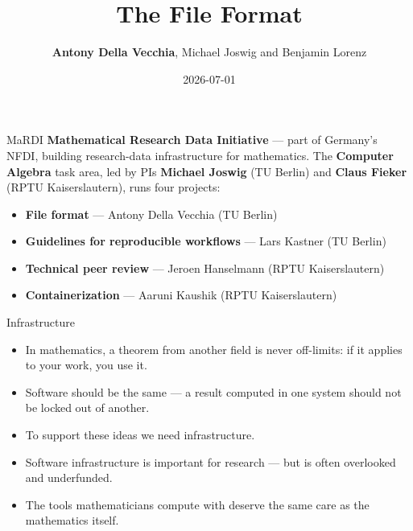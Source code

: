 \documentclass[9pt]{beamer}
\author[Antony Della Vecchia]{\textbf{Antony Della Vecchia}, Michael Joswig and Benjamin Lorenz}
\title{The \mrdi File Format}
\institute[]{
  TU Berlin
}
\date{
  2026-07-01
}
\newenvironment{fillitemize}
  {\vspace{\fill}\begin{itemize}\setlength{\itemsep}{\fill}}
  {\end{itemize}\vspace{\fill}}
\begin{document}
\maketitle

\begin{frame}[fragile]{MaRDI}
  \textbf{Mathematical Research Data Initiative} --- part of Germany's NFDI,
  building research-data infrastructure for mathematics. \pause
  \vfill
  The \textbf{Computer Algebra} task area, led by PIs
  \textbf{Michael Joswig} (TU Berlin) and \textbf{Claus Fieker}
  (RPTU Kaiserslautern), runs four projects: \pause
  \begin{itemize}
  \item \textbf{File format} --- Antony Della Vecchia (TU Berlin) 
  \item \textbf{Guidelines for reproducible workflows} --- Lars Kastner (TU Berlin) 
  \item \textbf{Technical peer review} --- Jeroen Hanselmann (RPTU Kaiserslautern) 
  \item \textbf{Containerization} --- Aaruni Kaushik (RPTU Kaiserslautern)
  \end{itemize}
\end{frame}


\begin{frame}[fragile, t]{Infrastructure}
  \begin{fillitemize}
  \item In mathematics, a theorem from another field is never off-limits:
    if it applies to your work, you use it. \pause
  \item Software should be the same --- a result computed in one system should
    not be locked out of another. \pause
  \item To support these ideas we need infrastructure.

  \item Software infrastructure is important for research --- but is often overlooked and underfunded. \pause
  \item The tools mathematicians compute with deserve the same care as the
    mathematics itself. \pause

  \end{fillitemize}
\end{frame}
\end{document}
